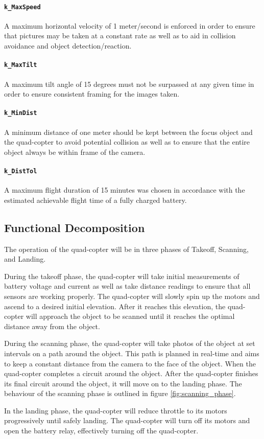\documentclass[10pt,letterpaper]{article}
\begin{document}
\paragraph{\texttt{k\_MaxSpeed}} A maximum horizontal velocity of 1 meter/second is enforced in order to ensure that pictures may be taken at a constant rate as well as to aid in collision avoidance and object detection/reaction.
\paragraph{\texttt{k\_MaxTilt}} A maximum tilt angle of 15 degrees must not be surpassed at any given time in order to ensure consistent framing for the images taken.
\paragraph{\texttt{k\_MinDist}} A minimum distance of one meter should be kept between the focus object and the quad-copter to avoid potential collision as well as to ensure that the entire object always be within frame of the camera.
\paragraph{\texttt{k\_DistTol}} A maximum flight duration of 15 minutes was chosen in accordance with the estimated achievable flight time of a fully charged battery.


\subsection{Functional Decomposition}
The operation of the quad-copter will be in three phases of Takeoff, Scanning, and Landing. \par
During the takeoff phase, the quad-copter will take initial measurements of battery voltage and current as well as take distance readings to ensure that all sensors are working properly. The quad-copter will slowly spin up the motors and ascend to a desired initial elevation. After it reaches this elevation, the quad-copter will approach the object to be scanned until it reaches the optimal distance away from the object. \par
During the scanning phase, the quad-copter will take photos of the object at set intervals on a path around the object. This path is planned in real-time and aims to keep a constant distance from the camera to the face of the object. When the quad-copter completes a circuit around the object. After the quad-copter finishes its final circuit around the object, it will move on to the landing phase. The behaviour of the scanning phase is outlined in figure \ref{fig:scanning_phase}. \par
In the landing phase, the quad-copter will reduce throttle to its motors progressively until safely landing. The quad-copter will turn off its motors and open the battery relay, effectively turning off the quad-copter.
\end{document}
